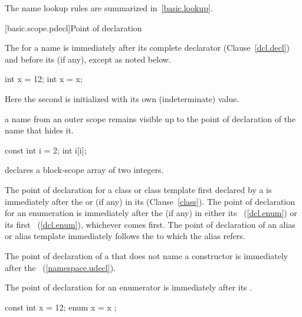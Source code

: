 \pnum
\enternote The name lookup rules are summarized in~\ref{basic.lookup}.
\exitnote

[basic.scope.pdecl]{Point of declaration}

\pnum
{}%
The  for a name is immediately after its
complete declarator (Clause~\ref{dcl.decl}) and before its
 (if any), except as noted below. \enterexample

\begin{codeblock}
int x = 12;
{ int x = x; }
\end{codeblock}

Here the second  is initialized with its own (indeterminate)
value. \exitexample

\pnum
\enternote 
{}%
a name from an outer scope remains visible up
to the point of declaration of the name that hides it.\enterexample

\begin{codeblock}
const int  i = 2;
{ int  i[i]; }
\end{codeblock}

declares a block-scope array of two integers. \exitexample \exitnote

\pnum
The point of declaration for a class or class template first declared by a
 is immediately after the  or
 (if any) in its 
(Clause~\ref{class}). The point of declaration for an enumeration is
immediately after the  (if any) in either its
~(\ref{dcl.enum}) or its first
~(\ref{dcl.enum}), whichever comes first.
The point of declaration of an alias or alias template immediately
follows the  to which the
alias refers.

\pnum
The point of declaration of a  that does not name a
constructor is immediately after the ~(\ref{namespace.udecl}).

\pnum
{}%
The point of declaration for an enumerator is immediately after its
.\enterexample

\begin{codeblock}
const int x = 12;
{ enum { x = x }; }
\end{codeblock}

